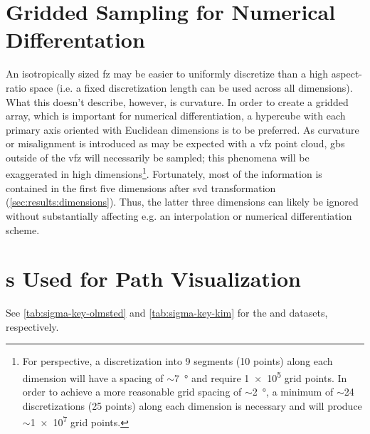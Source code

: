 \documentclass[preprint,12pt]{elsarticle}
\begin{document}
\section{Gridded Sampling for Numerical Differentation} \label{sec:supp:grid}
An isotropically sized \gls{fz} may be easier to uniformly discretize than a high aspect-ratio space (i.e. a fixed discretization length can be used across all dimensions). What this doesn't describe, however, is curvature. In order to create a gridded array, which is important for numerical differentiation, a hypercube with each primary axis oriented with Euclidean dimensions is to be preferred. As curvature or misalignment is introduced as may be expected with a \gls{vfz} point cloud, \glspl{gb} outside of the \gls{vfz} will necessarily be sampled; this phenomena will be exaggerated in high dimensions\footnote{For perspective, a discretization into 9 segments (10 points) along each dimension will have a spacing of $\sim$\SI{7}{\degree} and require \num{1e5} grid points. In order to achieve a more reasonable grid spacing of $\sim$\SI{2}{\degree}, a minimum of $\sim$\num{24} discretizations (25 points) along each dimension is necessary and will produce $\sim$\num{1e7} grid points. }. Fortunately, most of the information is contained in the first five dimensions after \gls{svd} transformation (\cref{sec:results:dimensions}). Thus, the latter three dimensions can likely be ignored without substantially affecting e.g. an interpolation or numerical differentiation scheme.

\section{s Used for Path Visualization} \label{sec:supp:sigma-key}

See \cref{tab:sigma-key-olmsted} and \cref{tab:sigma-key-kim} for the \citet{olmstedSurveyComputedGrain2009} and \citet{kimPhasefieldModeling3D2014} datasets, respectively.

\begin{table}[!htb]
    \centering
    \caption{Minimum $\Sigma$ (Sigma) \glspl{gb} and corresponding IDs used for path visualization within the original \citet{olmstedSurveyComputedGrain2009} dataset. }
    \label{tab:sigma-key-olmsted}
\end{table}

\begin{table}[!htb]
    \centering
    \caption{Minimum $\Sigma$ (Sigma) \glspl{gb} and corresponding IDs used for path visualization within the original \citet{kimPhasefieldModeling3D2014} dataset. }
    \label{tab:sigma-key-kim}
\end{table}

\printglossary

\clearpage


\end{document}
